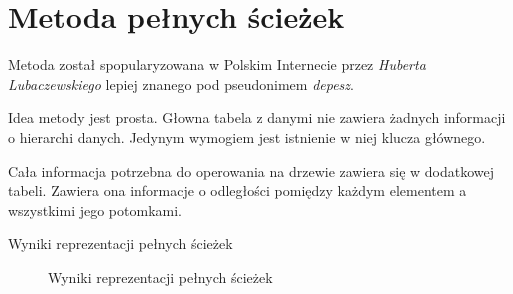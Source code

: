 \section{Metoda pełnych ścieżek}
% 


Metoda został spopularyzowana w Polskim Internecie przez \emph{Huberta Lubaczewskiego} lepiej znanego pod pseudonimem \emph{depesz}.


Idea metody jest prosta. 
Głowna tabela z danymi nie zawiera żadnych informacji o hierarchi danych. 
Jedynym wymogiem jest istnienie w niej klucza głównego.

Cała informacja potrzebna do operowania na drzewie zawiera się w dodatkowej tabeli. 
Zawiera ona informacje o odległości pomiędzy każdym elementem a wszystkimi jego potomkami.
 

\begin{table}[h!]
  \caption{Wyniki reprezentacji pełnych ścieżek}
   \begin{center}
   \end{center}
\end{table}

\begin{figure}[h!t]
  \caption{Wyniki reprezentacji pełnych ścieżek}
  \label{fig:img_chart_nested}
  \begin{center}
  \end{center}
\end{figure}
